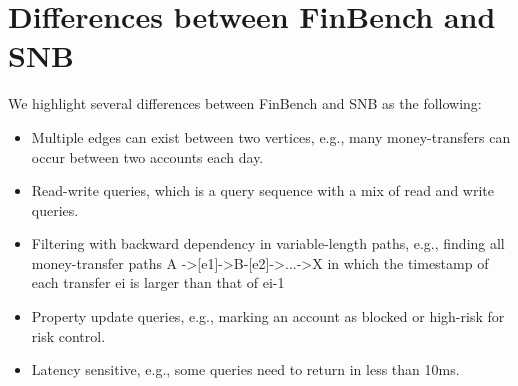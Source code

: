 \section{Differences between FinBench and SNB}

We highlight several differences between FinBench and SNB as the following:
\begin{itemize}
    \item Multiple edges can exist between two vertices, e.g., many
    money-transfers can occur between two accounts each day.
    \item Read-write queries, which is a query sequence with a mix of read and
    write queries.
    \item Filtering with backward dependency in variable-length paths, e.g.,
    finding all money-transfer paths A ->[e1]->B-[e2]->...->X  in which the
    timestamp of each transfer ei  is larger than that of ei-1
    \item Property update queries, e.g., marking an account as blocked or
    high-risk for risk control.
    \item Latency sensitive, e.g., some queries need to return in less than
    10ms.
\end{itemize}

